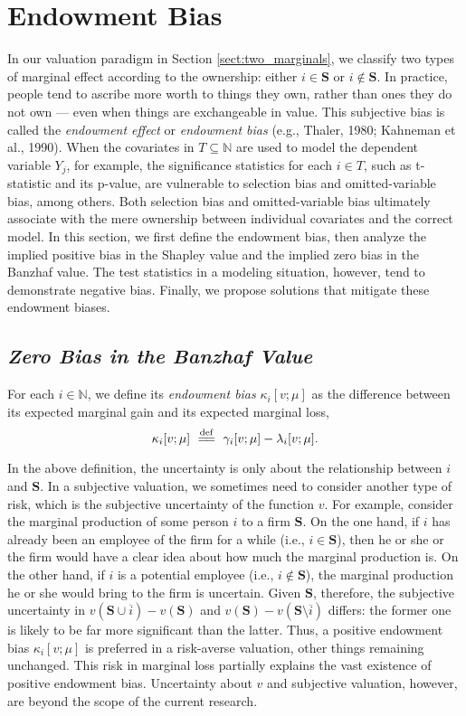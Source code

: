 \documentclass[a4paper,12pt]{article}
\newcommand{\eqdef}{\overset{\mathrm{def}}{=\joinrel=}}
\begin{document}
\section{Endowment Bias}\label{sect:eBias}
\noindent 
In our valuation paradigm in Section \ref{sect:two_marginals}, we classify two types of marginal effect 
according to the ownership: either $i \in {\mathbf S}$ or $i \not \in {\mathbf S}$.
In practice, people tend to ascribe more worth to things they own, 
rather than ones they do not own --- even when things are exchangeable in value. 
This subjective bias is called the \textit{endowment effect} or \textit{endowment bias} (e.g., Thaler, 1980; Kahneman et al., 1990).
When the covariates in $T\subseteq \mathbb{N}$ are used to model the dependent variable $Y_j$, for example,
the significance statistics for each $i\in T$, such as t-statistic and its p-value, are 
vulnerable to selection bias and omitted-variable bias, among others. 
Both selection bias and omitted-variable bias ultimately associate with the mere ownership between individual covariates and the correct model.
In this section, we first define the endowment bias, then analyze the implied positive bias in the Shapley value and the implied zero bias in the Banzhaf value. 
The test statistics in a modeling situation, however, tend to demonstrate negative bias.
Finally, we propose solutions that mitigate these endowment biases.


\subsection{\textit{Zero Bias in the Banzhaf Value}}
\noindent For each $i\in \mathbb{N}$, we define its \textit{endowment bias} $\kappa_i[v;\mu]$ as the difference between 
its expected marginal gain and its expected marginal loss,
$$
\kappa_i[v;\mu] \
\eqdef \ \gamma_i[v;\mu] - \lambda_i[v;\mu].
$$

In the above definition, the uncertainty is only about the relationship between $i$ and $\mathbf{S}$.
In a subjective valuation, we sometimes need to consider another type of risk, which is the subjective uncertainty of the function $v$. 
For example, consider the marginal production of some person $i$ to a firm $\mathbf{S}$. 
On the one hand, if $i$ has already been an employee of the firm for a while (i.e., $i\in \mathbf{S}$), then he or she or the firm would have a clear idea about how much the marginal production is. 
On the other hand, if $i$ is a potential employee (i.e., $i\not \in \mathbf{S}$), the marginal production he or she would bring to the firm is uncertain. 
Given $\mathbf{S}$, therefore, the subjective uncertainty in $v(\mathbf{S} \cup \overline{i})-v(\mathbf{S})$ and $v(\mathbf{S})-v(\mathbf{S} \setminus \overline{i})$ differs:
the former one  is likely to be far more significant than the latter.
Thus, a positive endowment bias $\kappa_i [v; \mu]$ is preferred in a risk-averse valuation, other things remaining unchanged. 
This risk in marginal loss partially explains the vast existence of positive endowment bias. 
Uncertainty about $v$ and subjective valuation, however, are beyond the scope of the current research.
\end{document}
